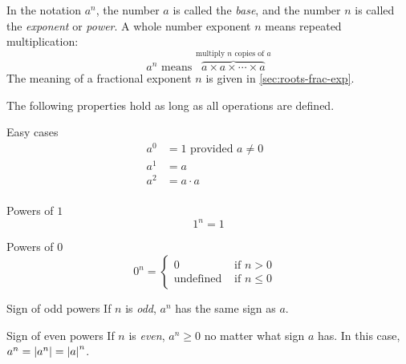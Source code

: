 
In the notation $a^n$, the number $a$ is called the \emph{base}, and the number $n$ is called the \emph{exponent} or \emph{power}.
A whole number exponent $n$ means repeated multiplication:
\begin{equation*}
 a^n \text{ means } \overbrace{a \times a \times \cdots \times a}^{\text{multiply $n$ copies of $a$}}
\end{equation*}
The meaning of a fractional exponent $n$ is given in \cref{sec:roots-frac-exp}.

The following properties hold as long as all operations are defined.

\begin{multicols}{2}

 \begin{FormulaBox}{Easy cases}
  \begin{equation*}
   \begin{split}
     a^0 &= 1  \text{ provided $a \neq 0$ }
     \\
     a^1 &= a
     \\
     a^2 &= a \cdot a
     \\
   \end{split}
  \end{equation*}
 \end{FormulaBox}

 \begin{FormulaBox}{Powers of $1$}
  \begin{equation*}
   1^n = 1
  \end{equation*}
 \end{FormulaBox}

 \begin{FormulaBox}{Powers of $0$}
  \begin{equation*}
   0^n =
   \begin{cases}
     0 & \text{ if $n > 0$}
     \\
     \text{undefined} & \text{ if $n \leq 0$ }
   \end{cases}
  \end{equation*}
 \end{FormulaBox}

 \begin{FormulaBox}{Sign of odd powers}
  If $n$ is \emph{odd}, $a^n$ has the same sign as $a$.
 \end{FormulaBox}

 \begin{FormulaBox}{Sign of even powers}
  If $n$ is \emph{even}, $a^n \geq 0$ no matter what sign $a$ has.
  In this case, $a^n = \left\lvert a^n\right\rvert = \left\lvert a\right\rvert^n$.
 \end{FormulaBox}


\end{multicols}
